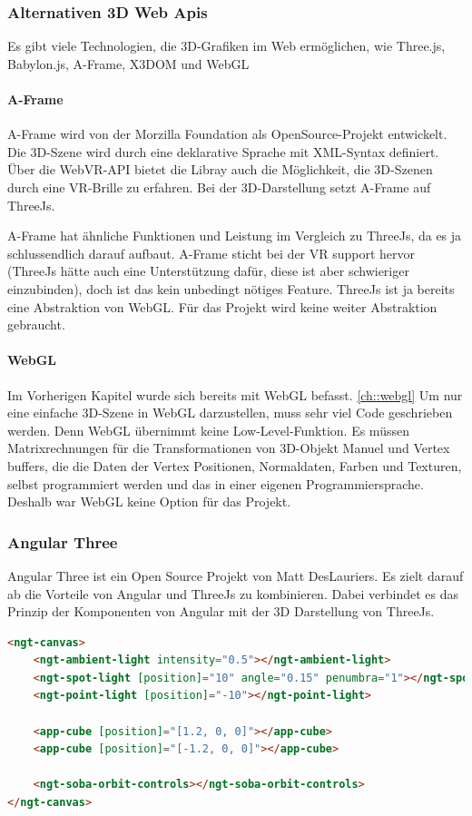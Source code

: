 \subsubsection{Alternativen 3D Web Apis}
Es gibt viele Technologien, die 3D-Grafiken im Web ermöglichen, wie Three.js, Babylon.js, A-Frame, X3DOM und WebGL

\paragraph{A-Frame}
A-Frame wird von der Morzilla Foundation als OpenSource-Projekt entwickelt. Die 3D-Szene wird durch eine deklarative Sprache mit XML-Syntax definiert. Über die WebVR-API bietet die Libray auch die Möglichkeit, die 3D-Szenen durch eine VR-Brille zu erfahren. Bei der 3D-Darstellung setzt A-Frame auf ThreeJs. \cite[A-Frame Wikipedia]{a-frame-wiki}

A-Frame hat ähnliche Funktionen und Leistung im Vergleich zu ThreeJs, da es ja schlussendlich darauf aufbaut. A-Frame sticht bei der VR support hervor (ThreeJs hätte auch eine Unterstützung dafür, diese ist aber schwieriger einzubinden), doch ist das kein unbedingt nötiges Feature. ThreeJs ist ja bereits eine Abstraktion von WebGL. Für das Projekt wird keine weiter Abstraktion gebraucht.

\paragraph{WebGL}
Im Vorherigen Kapitel wurde sich bereits mit WebGL befasst. \ref{ch::webgl}
Um nur eine einfache 3D-Szene in WebGL darzustellen, muss sehr viel Code geschrieben werden. Denn WebGL übernimmt keine Low-Level-Funktion. Es müssen Matrixrechnungen für die Transformationen von 3D-Objekt Manuel und Vertex buffers, die die Daten der Vertex Positionen, Normaldaten, Farben und Texturen, selbst programmiert werden und das in einer eigenen Programmiersprache. Deshalb war WebGL keine Option für das Projekt.

\subsubsection{Angular Three}
\label{ch:Technologien:AngularThree}
Angular Three ist ein Open Source Projekt von Matt DesLauriers. Es zielt darauf ab die Vorteile von Angular und ThreeJs zu kombinieren. Dabei verbindet es das Prinzip der Komponenten von Angular mit der 3D Darstellung von ThreeJs. 

\begin{lstlisting}[language=html,caption=Angular Three - Komponentenbasiertes 3D Scenen in HTML,label=lst:impl:AngularThreeExampleCode]
<ngt-canvas>
    <ngt-ambient-light intensity="0.5"></ngt-ambient-light>
    <ngt-spot-light [position]="10" angle="0.15" penumbra="1"></ngt-spot-light>
    <ngt-point-light [position]="-10"></ngt-point-light>
  
    <app-cube [position]="[1.2, 0, 0]"></app-cube>
    <app-cube [position]="[-1.2, 0, 0]"></app-cube>
  
    <ngt-soba-orbit-controls></ngt-soba-orbit-controls>
</ngt-canvas>
\end{lstlisting}

